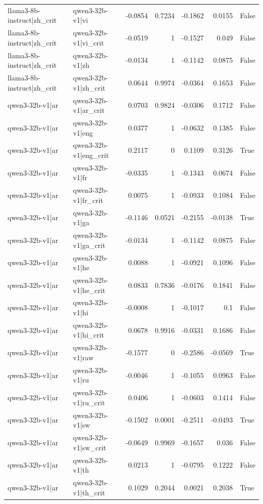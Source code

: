 \begin{table}
\begin{tabular}{l l r r r r l}
llama3-8b-instruct|zh_crit & qwen3-32b-v1|vi & -0.0854 & 0.7234 & -0.1862 & 0.0155 & False \\
llama3-8b-instruct|zh_crit & qwen3-32b-v1|vi_crit & -0.0519 & 1 & -0.1527 & 0.049 & False \\
llama3-8b-instruct|zh_crit & qwen3-32b-v1|zh & -0.0134 & 1 & -0.1142 & 0.0875 & False \\
llama3-8b-instruct|zh_crit & qwen3-32b-v1|zh_crit & 0.0644 & 0.9974 & -0.0364 & 0.1653 & False \\
qwen3-32b-v1|ar & qwen3-32b-v1|ar_crit & 0.0703 & 0.9824 & -0.0306 & 0.1712 & False \\
qwen3-32b-v1|ar & qwen3-32b-v1|eng & 0.0377 & 1 & -0.0632 & 0.1385 & False \\
qwen3-32b-v1|ar & qwen3-32b-v1|eng_crit & 0.2117 & 0 & 0.1109 & 0.3126 & True \\
qwen3-32b-v1|ar & qwen3-32b-v1|fr & -0.0335 & 1 & -0.1343 & 0.0674 & False \\
qwen3-32b-v1|ar & qwen3-32b-v1|fr_crit & 0.0075 & 1 & -0.0933 & 0.1084 & False \\
qwen3-32b-v1|ar & qwen3-32b-v1|ga & -0.1146 & 0.0521 & -0.2155 & -0.0138 & True \\
qwen3-32b-v1|ar & qwen3-32b-v1|ga_crit & -0.0134 & 1 & -0.1142 & 0.0875 & False \\
qwen3-32b-v1|ar & qwen3-32b-v1|he & 0.0088 & 1 & -0.0921 & 0.1096 & False \\
qwen3-32b-v1|ar & qwen3-32b-v1|he_crit & 0.0833 & 0.7836 & -0.0176 & 0.1841 & False \\
qwen3-32b-v1|ar & qwen3-32b-v1|hi & -0.0008 & 1 & -0.1017 & 0.1 & False \\
qwen3-32b-v1|ar & qwen3-32b-v1|hi_crit & 0.0678 & 0.9916 & -0.0331 & 0.1686 & False \\
qwen3-32b-v1|ar & qwen3-32b-v1|raw & -0.1577 & 0 & -0.2586 & -0.0569 & True \\
qwen3-32b-v1|ar & qwen3-32b-v1|ru & -0.0046 & 1 & -0.1055 & 0.0963 & False \\
qwen3-32b-v1|ar & qwen3-32b-v1|ru_crit & 0.0406 & 1 & -0.0603 & 0.1414 & False \\
qwen3-32b-v1|ar & qwen3-32b-v1|sw & -0.1502 & 0.0001 & -0.2511 & -0.0493 & True \\
qwen3-32b-v1|ar & qwen3-32b-v1|sw_crit & -0.0649 & 0.9969 & -0.1657 & 0.036 & False \\
qwen3-32b-v1|ar & qwen3-32b-v1|th & 0.0213 & 1 & -0.0795 & 0.1222 & False \\
qwen3-32b-v1|ar & qwen3-32b-v1|th_crit & 0.1029 & 0.2044 & 0.0021 & 0.2038 & True \\

\end{tabular}
\end{table}
